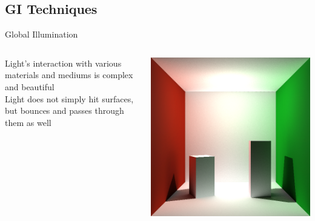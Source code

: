 \documentclass[10pt,compress,professionalfont]{beamer}
\begin{document}
\subsection{GI Techniques}
\begin{frame}{Global Illumination}

    \begin{columns}
        \begin{column}{0.55\textwidth}
	    Light's interaction with various materials and mediums is complex and beautiful\\
	    \vspace{6mm}
	    Light does not simply hit surfaces, but bounces and passes through them as well\\

        \end{column}
        \begin{column}{0.45\textwidth}
            {\centering
                \vspace{-4mm}
                \includegraphics[width=\textwidth]{../img/indirect_box_high}
            }
        \end{column}
    \end{columns}

\end{frame}
\end{document}
